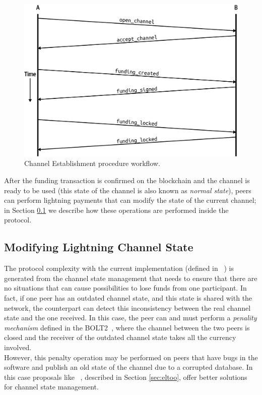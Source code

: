 \begin{figure}[h]
  \begin{center}
  \includegraphics[width=0.6\columnwidth]{imgs/mtln_0703.png}
  \end{center}
    \caption{Channel Establishment procedure workflow.~\cite{lnbook}}
  \label{fig:channel-establishment}
\end{figure}

After the funding transaction is confirmed on the blockchain and the channel is ready to be used (this state of the channel is also known as \emph{normal state}),
peers can perform lightning payments that can modify the state of the current channel; in Section \ref{sec:modify_channel_state} we describe how these operations are performed inside the protocol.

\subsection{Modifying Lightning Channel State}\label{sec:modify_channel_state}

The {\LN} protocol complexity with the current implementation (defined in ~\cite{lightning-bolts})
is generated from the channel state management that needs to ensure that there are no situations that can
cause  possibilities to lose funds from one participant.
In fact, if one peer has an outdated channel state, and this state is shared with the network, the counterpart can
detect this inconsistency between the real channel state and the one received. In this case, the peer can and must
perform  a \emph{penality mechanism} defined in the BOLT2~\cite{bolt2}, where the channel between the two peers
is closed and the receiver of the outdated channel state takes all the currency involved.\\
However, this penalty operation may be performed on peers that have bugs in the software and publish an old state of the
channel due to a corrupted database. In this case proposals like ~\cite{eltoo}, described in Section \ref{sec:eltoo}, offer
better solutions for channel state management.

